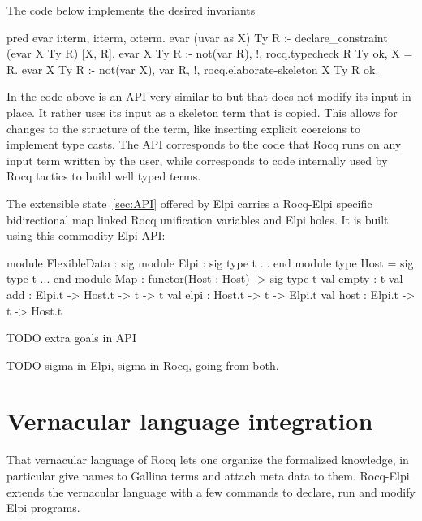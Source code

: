 \documentclass[a4paper, 11pt]{book}
\begin{document}
The code below implements the desired invariants

\begin{elpicode}
pred evar i:term, i:term, o:term. %
evar (uvar as X) Ty R :- declare_constraint (evar X Ty R) [X, R].
evar X Ty R :- not(var R), !, rocq.typecheck R Ty ok, X = R.
evar X Ty R :- not(var X), var R, !, rocq.elaborate-skeleton X Ty R ok.
\end{elpicode}

In the code above  is an API
very similar to  but that does not modify
its input in place. It rather uses its input as a skeleton term that is
copied. This allows for changes to the structure of the term, like inserting
explicit coercions to implement type casts. The API corresponds to the code
that Rocq runs on any input term written by the user, while 
corresponds to code internally used by Rocq tactics to build well typed terms.

The extensible state~\ref{sec:API} offered by Elpi carries a Rocq-Elpi specific
bidirectional map linked Rocq unification variables and Elpi holes.
It is built using this commodity Elpi API:

\begin{ocamlcode}
module FlexibleData : sig
  module Elpi : sig type t ... end
  module type Host = sig type t ... end
  module Map : functor(Host : Host) -> sig
    type t
    val empty : t
    val add : Elpi.t -> Host.t -> t -> t
    val elpi   : Host.t -> t -> Elpi.t
    val host : Elpi.t -> t -> Host.t
\end{ocamlcode}

TODO extra goals in API

TODO sigma in Elpi, sigma in Rocq, going from both.




\section{Vernacular language integration}

That vernacular language of Rocq lets one organize the formalized knowledge,
in particular give names to Gallina terms and attach meta data to them.
Rocq-Elpi extends the vernacular language with a few commands to declare, run
and modify Elpi programs.
\end{document}
